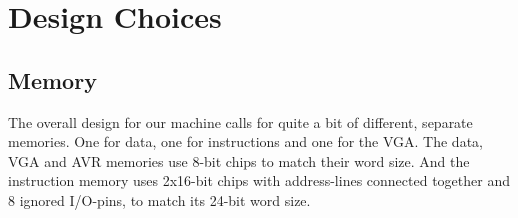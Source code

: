 \section {Design Choices}

\subsection {Memory}
The overall design for our machine calls for quite a bit of different, separate memories. One for data,
one for instructions and one for the VGA. The data, VGA and AVR memories use 8-bit chips to match
their word size. And the instruction memory uses 2x16-bit chips with address-lines connected
together and 8 ignored I/O-pins, to match its 24-bit word size.
\begin{comment}
Tok dette ut siden dette allerede er diskutert tidligere i rapporten
~Mads

One of the
earliest design choices that led to this was the decision to have separate instruction/data-memories.
The reasoning behind this choice being that we could avoid the bottleneck that would be introduced
from sharing memories.
\end{comment}

\begin{comment}
Skrev om for å skille ut prosess
~Mads

Since the requirements for the data/instruction memories differed in both size and word-width 
we wound up with not only separate, but also different chips for this purpose (The data-memory required
8-bit words, the instruction-width was 24-bit, and since we wanted to avoid using multiple memory accesses
to get a complete instruction, we needed a wide enough memory chip for that purpose. 24-bit chips were out of
production, and 32-bit memory was too expensive, thus the solution became 2x16-bit chips with their address-lines
connected together and 8 ignored I/O-pins, effectively making them a 24-bit memory).

Since we wanted to reduce the sharing of memories as much as possible, we also needed a separate memory for
our \ac{VGA} controller, as that needed to read it's buffer as fast as possible without interfering with the speed
of the rest of the system. This called for a memory that was big enough to hold at least a full screen-frame,
at 8-bit per pixel (since each pixel is an 8-bit greyscale pixel).

To reduce the possibility of having too slow data-access from the AVR, an extra memory was added to work as
a buffer for the AVR as well. This design choice was made {\em after} ordering, which meant that we had to choose from
the chips we had already ordered to fit this purpose. Since this was intended to carry data intended for the rest
of the system, and as the rest of the system is working with data in 8-bit bytes, we ended up using one of the
extra chips ordered as \ac{VGA} memory for this purpose.

Forresten, da vart det så kort at jeg bare tødde det in i avsnittet over. Må få jobbet prosess-delene inn igjen et eller annet sted!
~Mads
\end{comment}

